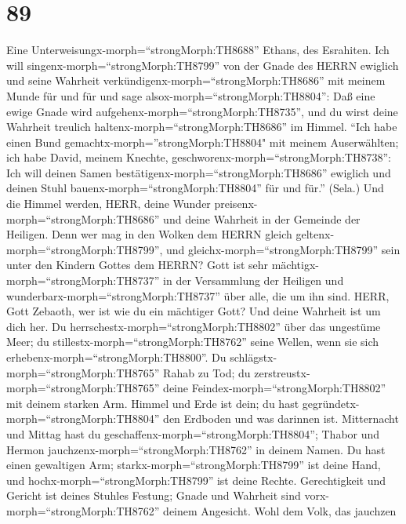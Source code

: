 \hypertarget{section-88}{%
\section{89}\label{section-88}}

 Eine Unterweisungx-morph=``strongMorph:TH8688'' Ethans, des
Esrahiten. Ich will singenx-morph=``strongMorph:TH8799'' von der Gnade
des HERRN ewiglich und seine Wahrheit
verkündigenx-morph=``strongMorph:TH8686'' mit meinem Munde für und für
 und sage alsox-morph=``strongMorph:TH8804'': Daß eine ewige
Gnade wird aufgehenx-morph=``strongMorph:TH8735'', und du wirst deine
Wahrheit treulich haltenx-morph=``strongMorph:TH8686'' im Himmel.
 ``Ich habe einen Bund gemachtx-morph=''strongMorph:TH8804"
mit meinem Auserwählten; ich habe David, meinem Knechte,
geschworenx-morph=``strongMorph:TH8738'':  Ich will deinen
Samen bestätigenx-morph=``strongMorph:TH8686'' ewiglich und deinen Stuhl
bauenx-morph=``strongMorph:TH8804'' für und für.'' (Sela.) 
Und die Himmel werden, HERR, deine Wunder
preisenx-morph=``strongMorph:TH8686'' und deine Wahrheit in der Gemeinde
der Heiligen.  Denn wer mag in den Wolken dem HERRN gleich
geltenx-morph=``strongMorph:TH8799'', und
gleichx-morph=``strongMorph:TH8799'' sein unter den Kindern Gottes dem
HERRN?  Gott ist sehr mächtigx-morph=``strongMorph:TH8737''
in der Versammlung der Heiligen und
wunderbarx-morph=``strongMorph:TH8737'' über alle, die um ihn sind.
 HERR, Gott Zebaoth, wer ist wie du ein mächtiger Gott? Und
deine Wahrheit ist um dich her.  Du
herrschestx-morph=``strongMorph:TH8802'' über das ungestüme Meer; du
stillestx-morph=``strongMorph:TH8762'' seine Wellen, wenn sie sich
erhebenx-morph=``strongMorph:TH8800''.  Du
schlägstx-morph=``strongMorph:TH8765'' Rahab zu Tod; du
zerstreustx-morph=``strongMorph:TH8765'' deine
Feindex-morph=``strongMorph:TH8802'' mit deinem starken Arm.
 Himmel und Erde ist dein; du hast
gegründetx-morph=``strongMorph:TH8804'' den Erdboden und was darinnen
ist.  Mitternacht und Mittag hast du
geschaffenx-morph=``strongMorph:TH8804''; Thabor und Hermon
jauchzenx-morph=``strongMorph:TH8762'' in deinem Namen.  Du
hast einen gewaltigen Arm; starkx-morph=``strongMorph:TH8799'' ist deine
Hand, und hochx-morph=``strongMorph:TH8799'' ist deine Rechte.
 Gerechtigkeit und Gericht ist deines Stuhles Festung;
Gnade und Wahrheit sind vorx-morph=``strongMorph:TH8762'' deinem
Angesicht.  Wohl dem Volk, das jauchzen

